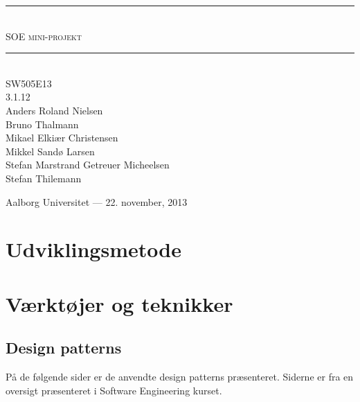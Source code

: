 



\begin{titlepage}
\newcommand{\HRule}{\rule{\linewidth}{0.5mm}}

\begin{center}

\HRule \\[0.5cm]
\textsc{ \Huge SOE mini-projekt}\\[0.3cm]

\HRule \\[1cm]

\textsc{\Large SW505E13 \\ 3.1.12}\\[0.5cm]

{\large
Anders Roland Nielsen \\
Bruno Thalmann \\
Mikael Elkiær Christensen \\
Mikkel Sandø Larsen \\
Stefan Marstrand Getreuer Micheelsen \\
Stefan Thilemann
}

\vfill

{\large Aalborg Universitet --- 22. november, 2013}

\end{center}

\end{titlepage}

\tableofcontents

\chapter{Udviklingsmetode}\label{udviklingsmetode}

\chapter{Værktøjer og teknikker}


\begin{appendices}
\chapter{Design patterns}
\label{appendix:patterns}
På de følgende sider er de anvendte design patterns præsenteret.
Siderne er fra en oversigt præsenteret i Software Engineering kurset.

\end{appendices}

